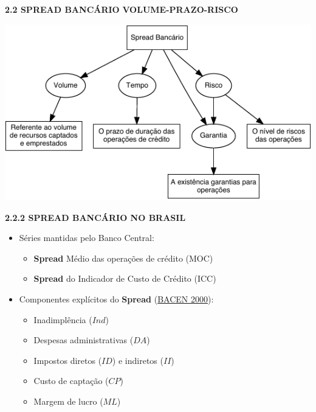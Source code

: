 \documentclass[
  ignorenonframetext,
  aspectratio=169,
  ignorenonframetext]{beamer}
\begin{document}
\begin{frame}{\textbf{2.2 SPREAD BANCÁRIO}}
\protect\hypertarget{spread-bancuxe1rio-2}{}
\textbf{VOLUME-PRAZO-RISCO}

\begin{center}\includegraphics{02-final_presentation-V1_files/figure-beamer/diagram.spread.vol.tem.ris-1} \end{center}
\end{frame}

\begin{frame}{\textbf{2.2.2 SPREAD BANCÁRIO NO BRASIL}}
\protect\hypertarget{spread-bancuxe1rio-no-brasil}{}
\begin{itemize}
\item
  Séries mantidas pelo Banco Central:

  \begin{itemize}
  \item
    \textbf{Spread} Médio das operações de crédito (MOC)
  \item
    \textbf{Spread} do Indicador de Custo de Crédito (ICC)
  \end{itemize}
\item
  Componentes explícitos do \textbf{Spread}
  (\protect\hyperlink{ref-BCB:2000}{BACEN 2000}):

  \begin{itemize}
  \item
    Inadimplência (\(Ind\))
  \item
    Despesas administrativas (\(DA\))
  \item
    Impostos diretos (\(ID\)) e indiretos (\(II\))
  \item
    Custo de captação (\(CP\))
  \item
    Margem de lucro (\(ML\))
  \end{itemize}
\end{itemize}
\end{frame}
\end{document}
